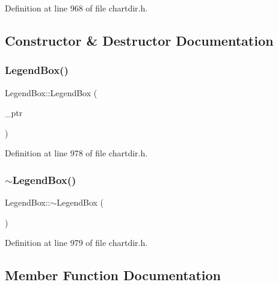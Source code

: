 Definition at line 968 of file chartdir.\+h.



\subsection{Constructor \& Destructor Documentation}
\mbox{\label{class_legend_box_a5bae0da7ee969874787ae0596a78dc8e}} 
\subsubsection{\texorpdfstring{Legend\+Box()}{LegendBox()}}
{\footnotesize\ttfamily Legend\+Box\+::\+Legend\+Box (\begin{DoxyParamCaption}\item[{Legend\+Box\+Internal $\ast$}]{\+\_\+ptr }\end{DoxyParamCaption})\hspace{0.3cm}{\ttfamily [inline]}}



Definition at line 978 of file chartdir.\+h.

\mbox{\label{class_legend_box_a85378d4eeefa12921c33ebd19923e08d}} 
\subsubsection{\texorpdfstring{$\sim$\+Legend\+Box()}{~LegendBox()}}
{\footnotesize\ttfamily Legend\+Box\+::$\sim$\+Legend\+Box (\begin{DoxyParamCaption}{ }\end{DoxyParamCaption})\hspace{0.3cm}{\ttfamily [inline]}}



Definition at line 979 of file chartdir.\+h.



\subsection{Member Function Documentation}
\mbox{\label{class_legend_box_ac1c4a3c6176a53220b19fef775dcd201}} 
